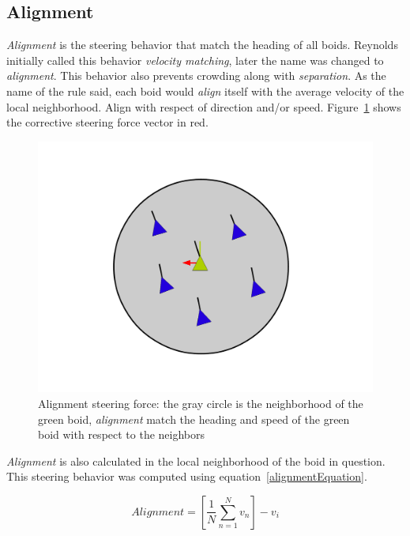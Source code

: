 \subsection{Alignment}
\textit{Alignment} is the steering behavior that match the heading of all boids. Reynolds initially called this behavior \textit{velocity matching}, later the name was changed to \textit{alignment}. This behavior also prevents crowding along with \textit{separation}. As the name of the rule said, each boid would \textit{align} itself with the average velocity of the local neighborhood. Align with respect of direction and/or speed. Figure~\ref{alignmentPDF}  shows the corrective steering force vector in red.

\begin{figure}[htbp]
\begin{center}
\includegraphics[scale=0.3]{figures/alignment.pdf}
\caption{Alignment steering force: the gray circle is the neighborhood of the green boid, \textit{alignment} match the heading and speed of the green boid with respect to the neighbors}
\label{alignmentPDF}
\end{center}
\end{figure}

\textit{Alignment} is also calculated in the local neighborhood of the boid in question. This steering behavior was computed using equation~\ref{alignmentEquation}.

\begin{equation}
\label{alignmentEquation}
Alignment = \left[  \frac{1}{N} \sum_{n=1}^{N} v_n \right ] - v_i
\end{equation}

